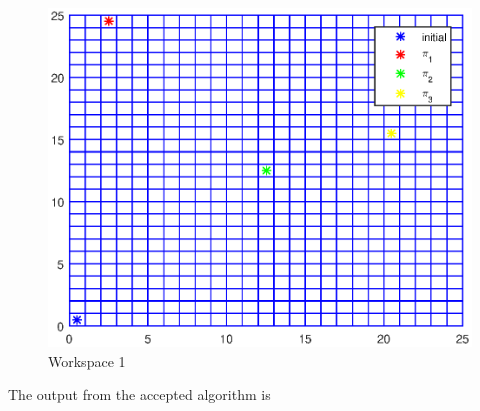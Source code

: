 \begin{figure}[!htb]
\centering
\includegraphics[scale=0.8]{workspace.eps}
\caption{Workspace 1}
\label{fig:workspace}
\end{figure}


The output from the accepted algorithm is \\


